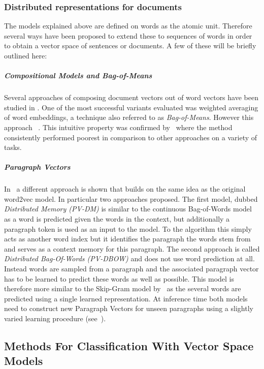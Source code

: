 \subsubsection*{Distributed representations for documents}
\label{subs:Distributed representations for documents}

The models explained above are defined on words as the atomic unit. Therefore several ways have been proposed to extend these to sequences of words in order to obtain a vector space of sentences or documents. A few of these will be briefly outlined here:

\subparagraph{Compositional Models and Bag-of-Means}
\label{subp:Bag-of-Means}

Several approaches of composing document vectors out of word vectors have been studied in \cite{Mitchell:2010aa}. One of the most successful variants evaluated was weighted averaging of word embeddings, a technique also referred to as \emph{Bag-of-Means}. However this approach ~\cite{Le:2014aa}. This intuitive property was confirmed by~\cite{Zhang:2015aa} where the method consistently performed poorest in comparison to other approaches on a variety of tasks.

\subparagraph{Paragraph Vectors}
\label{subp:Paragraph Vectors}

In~\cite{Le:2014aa} a different approach is shown that builds on the same idea as the original word2vec model. In particular two approaches proposed. The first model, dubbed \emph{Distributed Memory (PV-DM)} is similar to the continuous Bag-of-Words model as a word is predicted given the words in the context, but additionally a paragraph token is used as an input to the model. To the algorithm this simply acts as another word index but it identifies the paragraph the words stem from and serves as a context memory for this paragraph.
The second approach is called \emph{Distributed Bag-Of-Words (PV-DBOW)} and does not use word prediction at all. Instead words are sampled from a paragraph and the associated paragraph vector has to be learned to predict these words as well as possible. This model is therefore more similar to the Skip-Gram model by~\cite{Mikolov:2013a} as the several words are predicted using a single learned representation. At inference time both models need to construct new Paragraph Vectors for unseen paragraphs using a slightly varied learning procedure (see~\cite{Le:2014aa}).

\subsection{Methods For Classification With Vector Space Models}
\label{sub:Methods For Classification With Vector Space Models}

